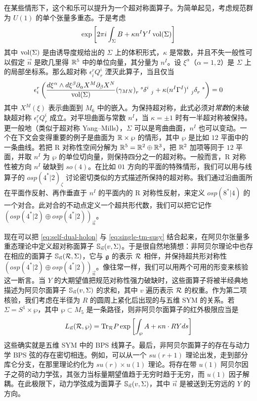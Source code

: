在某些情形下，这个和乐可以提升为一个超对称面算子。为简单起见，考虑规范群为 $U(1)$ 的单个张量多重态。于是考虑
\begin{equation}\label{eq:single-tm-susy}
\exp\left[ 2\pi i \int_{\Sigma} B + \kappa n^I Y^I \operatorname{vol}(\Sigma)\right]
\end{equation}
其中 $\operatorname{vol}(\Sigma)$ 是由诱导度规给出的 $\Sigma$ 上的体积形式，$\kappa$ 是常数，并且不失一般性可以假定 $\vec n$ 是欧几里得 $\mathbb{R}^5$ 中的单位向量，其分量为 $n^I$。设 $\xi^\alpha$（$\alpha = 1,2$）是 $\Sigma$ 上的局部坐标系。那么超对称 $\epsilon_i^r Q_r^i$ 湮灭此算子，当且仅当
\begin{equation}\label{eq:surface-susy-cond}
\epsilon_i^r \left( \frac{d\xi^\alpha \wedge d \xi^\beta \partial_\alpha X^M \partial_\beta X^N}{\operatorname{vol}(\Sigma) }(\gamma_{MN})_r^{~~s} \delta^i_{~~j} + \kappa (n^I \Gamma^I)^i_{~~j} \delta_{r}^{~~s} \right) =0
\end{equation}
其中 $X^M(\xi)$ 表示曲面到 $M_6$ 中的嵌入。为保持超对称，此式必须对\emph{常数}的未破缺超对称 $\epsilon_i^r Q_r^i$ 成立。对平坦曲面与常数 $n^I$，当 $\kappa=\pm 1$ 时有一半超对称被保持。更一般地（类似于超对称 Yang--Mills），$\Sigma$ 可以是弯曲曲面，$n^I$ 也可以变动。一个在下文会变得重要的例子是曲面为 $\mathbb{R} \times \wp$ 的情形，其中 $\wp$ 是比如 $12$ 平面中的一条曲线。若把 R 对称性空间分解为 $\mathbb{R}^5 = \mathbb{R}^2 \oplus \mathbb{R}^3$，把 $\mathbb{R}^2$ 加项等同于 $12$ 平面，并取 $n^I$ 为 $\wp$ 的单位切向量，则保持四分之一的超对称。一般而言，R 对称性被方向 $n^I$ 破缺到 $so(4)$。在比如 $01$ 方向的平面的特殊情形，我们可以用与线算子的 $osp(4^*\vert 2)_\zeta$ 讨论密切类似的方式描述所保持的超对称。我们通过沿曲面所在平面作反射、再作垂直于 $n^I$ 的平面内的 R 对称性反射，来定义 $osp(8^*\vert 4)$ 的一个对合。此对合的不动点定义一个超共形代数，我们可以把它记作 $(osp(4^*\vert 2) \oplus osp(4^*\vert 2))_{\vec n}$。

现在可以把 \eqref{eq:self-dual-holon}
与 \eqref{eq:single-tm-susy}
结合起来，在阿贝尔张量多重态理论中定义超对称面算子 ${\mathbb S}_{\vec n}(v,\Sigma)$。于是很自然地猜想：非阿贝尔理论中也存在相应的面算子 ${\mathbb S}_{\vec n}(\mathcal{R},\Sigma)$，它与 $\mathfrak{g}$ 的表示 $\mathcal{R}$ 相伴，并保持超共形对称性 $(osp(4^*\vert 2) \oplus osp(4^*\vert 2))_{\vec n}$。像往常一样，我们可以用两个可用的形变来核验这一断言。当 $Y$ 的大期望值把规范对称性强力破缺时，这些面算子将被半经典地描述为阿贝尔面算子 ${\mathbb S}_{\vec n}(v,\Sigma)$ 的求和，其中 $v$ 遍历表示 $\mathcal{R}$ 的权重。作为第二项核验，我们考虑在半径为 $R$ 的圆周上紧化后出现的与五维 SYM 的关系。若 $\Sigma = S^1\times \wp$，其中 $\wp\subset M_5$ 是一条路径，则非阿贝尔面算子的红外极限应当是
\begin{equation}\label{eq:5d-line-op}
L_{\vec n}(\mathcal{R}, \wp) = {\operatorname{Tr}}_{\mathcal{R}} P\exp \left[ \int_\wp  A + \kappa n\cdot R Y ds \right]
\end{equation}
这些确实就是五维 SYM 中的 BPS 线算子。最后，非阿贝尔面算子的存在与动力学 BPS 弦的存在密切相连。例如，可以从一个 $su(r+1)$ 理论出发，走到部分库仑分支，在那里理论约化为 $su(r) \times u(1)$ 理论。将存在带 $u(1)$ 阿贝尔因子之荷的动力学弦，其张力当标量期望值趋于无穷时趋于无穷，而 $u(1)$ 因子解耦。在此极限下，动力学弦成为面算子 ${\mathbb S}_{\vec n}(v,\Sigma)$，其中 $\vec n$ 是被送到无穷远的 $Y$ 的方向。


